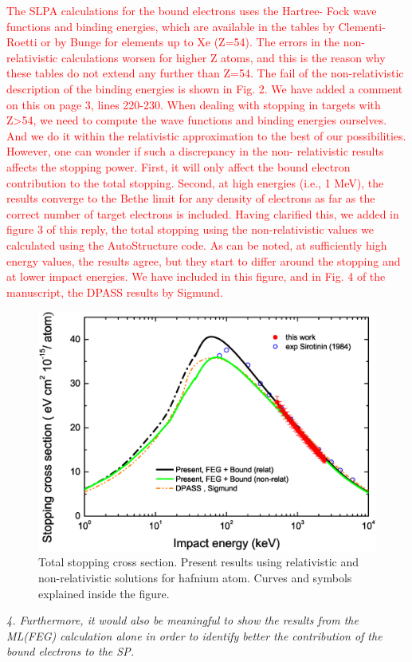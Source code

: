 \documentclass[a4paper,10pt]{article}
\def\reviewer#1{\vspace{0.35cm}\textsl{#1}}
\def\reply#1{\vspace{0.1cm}\textcolor{red}{#1}}
\begin{document}
\reply{The SLPA calculations for the bound electrons uses the Hartree-
Fock wave functions and binding energies, which are available in the 
tables by Clementi-Roetti or by Bunge for elements up to Xe (Z=54). The 
errors in the non-relativistic calculations worsen for higher Z atoms, 
and this is the reason why these tables do not extend any further than 
Z=54. The fail of the non-relativistic description of the binding 
energies is shown in Fig. 2. We have added a comment on this on page 3, 
lines 220-230. When dealing with stopping in targets with Z>54, we need 
to compute the wave functions and binding energies ourselves. And we do 
it within the relativistic approximation to the best of our 
possibilities. However, one can wonder if such a discrepancy in the non-
relativistic results affects the stopping power. First, it will only 
affect the bound electron contribution to the total stopping. Second, at 
high energies (i.e., 1 MeV), the results converge to the Bethe limit for 
any density of electrons as far as the correct number of target 
electrons is included. Having clarified this, we added in figure 3 of 
this reply, the total stopping using the non-relativistic values we 
calculated using the AutoStructure code. As can be noted, at 
sufficiently high energy values, the results agree, but they start to 
differ around the stopping and at lower impact energies. We have
included in this figure, and in Fig. 4 of the manuscript, the DPASS
results by Sigmund.}

\begin{figure}[!t]
\centering
\includegraphics[width=12.cm]{Fig05.eps}
\caption{Total stopping cross section. Present results using
relativistic and non-relativistic solutions for hafnium atom. 
Curves and symbols explained inside the figure.}
\label{NR}
\end{figure}
\reviewer{
4. Furthermore, it would also be meaningful to show the results from
the ML(FEG) calculation alone in order to identify better the
contribution of the bound electrons to the SP.}
\end{document}
